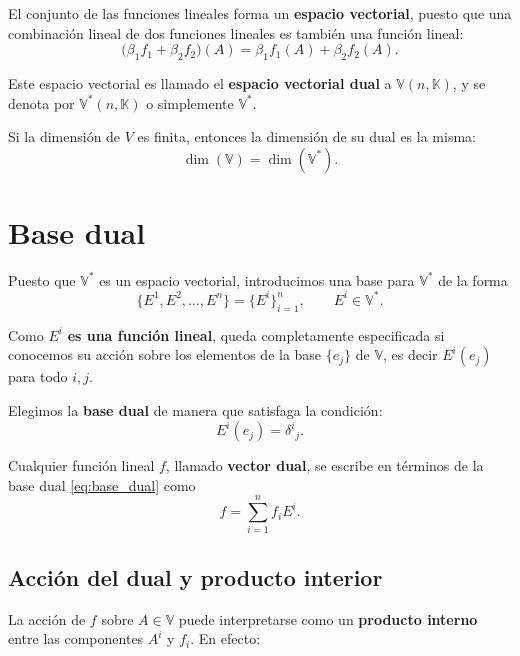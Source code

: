 \documentclass[../apunte_mecanica_clasica.tex]{subfiles}%
\begin{document}
El conjunto de las funciones lineales forma un \textbf{espacio vectorial}, 
puesto que una combinación lineal de dos funciones lineales es también una función lineal:
\begin{equation*}
    \big(\beta_1 f_1 + \beta_2 f_2\big)(A) 
    = \beta_1 f_1(A) + \beta_2 f_2(A).
\end{equation*}

Este espacio vectorial es llamado el \textbf{espacio vectorial dual} a $\mathbb{V}(n,\mathbb{K})$, 
y se denota por $\mathbb{V}^*(n,\mathbb{K})$ o simplemente $\mathbb{V}^*$.

Si la dimensión de $V$ es finita, entonces la dimensión de su dual es la misma:
\begin{equation*}
    \dim(\mathbb{V}) = \dim(\mathbb{V}^*).
\end{equation*}
    

\section{Base dual}

Puesto que $\mathbb{V}^*$ es un espacio vectorial, introducimos una base para $\mathbb{V}^*$ de la forma
\begin{equation}\label{eq:base_dual}
    \{E^1, E^2, \dots, E^n\} = \{E^i\}_{i=1}^n, 
    \qquad E^i \in \mathbb{V}^*.
\end{equation}

Como $E^i$ \textbf{es una función lineal}, queda completamente especificada si conocemos 
su acción sobre los elementos de la base $\{e_j\}$ de $\mathbb{V}$, es decir $E^i(e_j)$ para todo $i,j$.  

Elegimos la \textbf{base dual} de manera que satisfaga la condición:
\begin{equation}\label{eq:def_base_dual}
    E^i(e_j) = \delta^i{}_j.
\end{equation}

Cualquier función lineal $f$, llamado \textbf{vector dual}, 
se escribe en términos de la base dual \eqref{eq:base_dual} como
\begin{equation}\label{eq:vector_dual}
    f = \sum_{i=1}^n f_i E^i.
\end{equation}


\subsection{Acción del dual y producto interior}

La acción de $f$ sobre $A \in \mathbb{V}$ 
puede interpretarse como un \textbf{producto interno} 
entre las componentes $A^i$ y $f_i$. En efecto:
\end{document}
